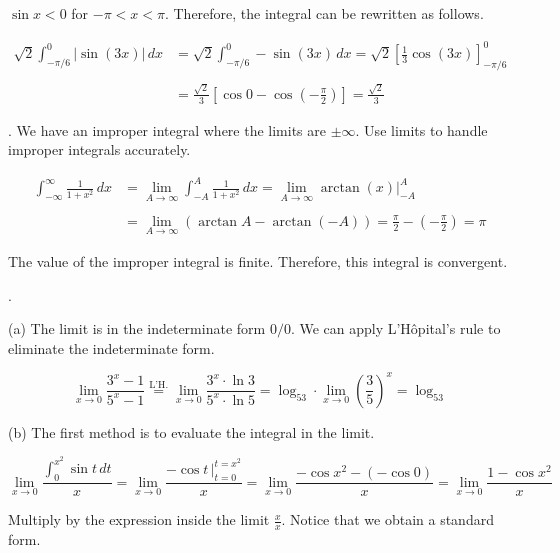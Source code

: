 \documentclass{article}
\begin{document}
\hfill

\noindent $\sin x<0$ for $-\pi<x<\pi$. Therefore, the integral can be rewritten as follows.

\begin{align*}\sqrt2\int_{-\pi/6}^0\left|\sin(3x)\right|\,dx&=\sqrt2\int_{-\pi/6}^0-\sin(3x)\,dx=\sqrt2\left[\frac13\cos(3x)\right]_{-\pi/6}^0\\\\&=\frac{\sqrt2}3\left[\cos0-\cos\left(-\frac\pi2\right)\right]=\boxed{\frac{\sqrt2}3}\end{align*}

\hfill

. We have an improper integral where the limits are $\pm\infty$. Use limits to handle improper integrals accurately.

\begin{align*}
\int_{-\infty}^\infty\frac1{1+x^2}\,dx&=\lim_{A\to\infty}\int_{-A}^A\frac1{1+x^2}\,dx = \lim_{A\to\infty}\arctan(x)\bigg|_{-A}^A\\\\&=\lim_{A\to\infty}\left(\arctan A-\arctan(-A)\right)=\frac\pi2-\left(-\frac\pi2\right)=\boxed\pi
\end{align*}

\hfill

\noindent The value of the improper integral is finite. Therefore, this integral is convergent.

\hfill

.

\hfill

\noindent (a) The limit is in the indeterminate form $0/0$. We can apply L'Hôpital's rule to eliminate the indeterminate form.

\[\lim_{x\to0}\frac{3^x-1}{5^x-1}\overset{\text{L'H.}}{=}\lim_{x\to0}\frac{3^x\cdot\ln3}{5^x\cdot\ln5}=\log_53\cdot\lim_{x\to0}\left(\frac35\right)^x=\boxed{\log_53}\]

\hfill

\noindent (b) The first method is to evaluate the integral in the limit.

\[\lim_{x\to0}\frac{\displaystyle\int_0^{x^2}\sin t\,dt}x=\lim_{x\to0} \frac{-\cos t\,\bigg|_{t=0}^{t=x^2}}x=\lim_{x\to0}\frac{-\cos x^2-(-\cos0)}x=\lim_{x\to0}\frac{1-\cos x^2}x\]

\hfill

\noindent Multiply by the expression inside the limit $\displaystyle \frac xx$. Notice that we obtain a standard form.
\end{document}
